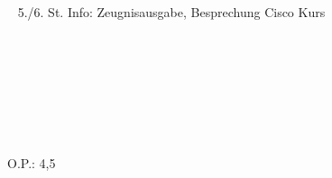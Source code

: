 {{	\textbullet~ 5./6. St. Info: Zeugnisausgabe, Besprechung Cisco Kurs\par
	\textbullet~ \par
	\textbullet~ \par
	\textbullet~ \par
	\textbullet~ 
	}{}{O.P.: 4,5}
}{}
\Unterschrift
\newpage
